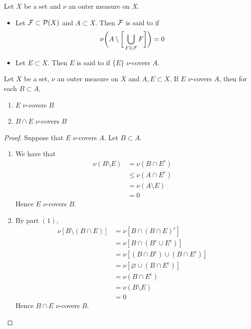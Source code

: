 \documentclass{book}
\begin{document}
	
	
	\begin{defn}  
		Let $X$ be a set and $\nu$ an outer measure on $X$. 
		\begin{itemize}
			\item Let $\mathcal{F} \subset \mathcal{P}(X)$ and $A \subset X$. Then $\mathcal{F}$ is said to  if 
			$$\nu \bigg(A \setminus \bigg[ \bigcup_{F \in \mathcal{F}} F \bigg] \bigg) = 0$$
			\item Let $E \subset X$. Then $E$ is said to  if $\{E\}$ $\nu$-covers $A$.
		\end{itemize}
	\end{defn}
	
	
	\begin{ex}   
		Let $X$ be a set, $\nu$ an outer measure on $X$ and $A, E \subset X$. If $E$ $\nu$-covers $A$, then for each $B \subset A$,
		\begin{enumerate}
			\item $E$ $\nu$-covers $B$
			\item $B \cap E$ $\nu$-covers $B$
		\end{enumerate}
	\end{ex}

	\begin{proof} Suppose that $E$ $\nu$-covers $A$. Let $B \subset A$.
		\begin{enumerate}
			\item We have that
			\begin{align*}
				\nu(B \setminus E)
				& = \nu(B \cap E^c) \\
				& \leq \nu(A \cap E^c) \\
				& = \nu(A \setminus E) \\
				& = 0
			\end{align*}
			Hence $E$ $\nu$-covers $B$.
			\item By part $(1)$, 
			\begin{align*}
				\nu[B \setminus (B \cap E)]
				& = \nu[B \cap (B \cap E)^c] \\
				& = \nu[ B \cap (B^c \cup E^c)] \\
				& = \nu[ (B \cap B^c) \cup (B \cap E^c)] \\
				& = \nu[\varnothing \cup (B \cap E^c)] \\
				& = \nu(B \cap E^c) \\
				& = \nu(B \setminus E) \\
				& = 0
			\end{align*}
			Hence $B \cap E$ $\nu$-covers $B$.
		\end{enumerate}
	\end{proof}
	
\end{document}
